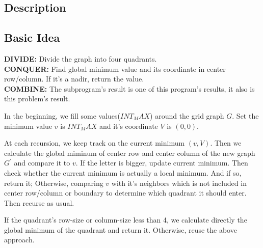 \documentclass[UTF8,a4paper]{article}
\begin{document}
	\subsection{Description}
	\subsection{Basic Idea}
	\textbf{\color{blue}DIVIDE: }Divide the graph into four quadrants.\\
	\textbf{\color{blue}CONQUER: }Find global minimum value and its coordinate in center row/column. If it's a nadir, return the value.\\
	\textbf{\color{blue}COMBINE: }The subprogram's result is one of this program's results, it also is this problem's result.
	
	In the beginning, we fill some values($ INT_MAX $) around the grid graph $ G $. Set the minimum value $ v $ is $ INT_MAX $ and it's coordinate $ V $ is $ (0,0) $. 
	
	At each recursion, we keep track on the current minimum $ (v,V) $. Then we calculate the global miminum of center row and center column of the new graph $ G^{'} $ and compare it to $ v $. If the letter is bigger, update current minimum. Then check whether the current minimum is actually a local minimum. And if so, return it; Otherwise, comparing $ v $ with it's neighbors which is not included in center row/column or boundary to determine which quadrant it should enter. Then recurse as usual.
	
	If the quadrant's row-size or column-size less than 4, we calculate directly the global minimum of the quadrant and return it. Otherwise, reuse the above approach.
	
\end{document}
